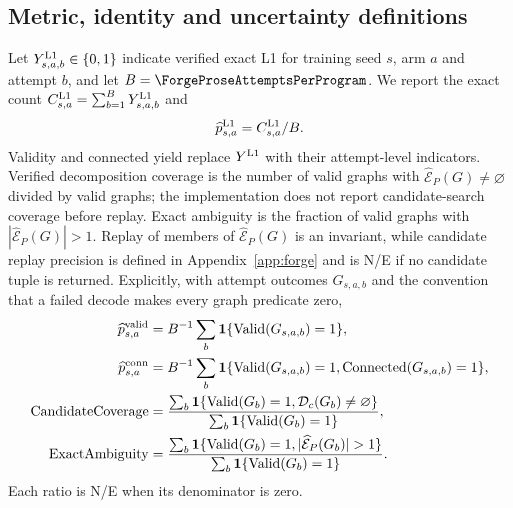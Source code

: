 \documentclass{article}
\begin{document}
\subsection{Metric, identity and uncertainty definitions}

Let $Y_{s,a,b}^{\rm L1}\in\{0,1\}$ indicate verified exact L1 for training seed $s$, arm $a$ and
attempt $b$, and let $B=\ForgeProseAttemptsPerProgram$. We report the exact count
$C_{s,a}^{\rm L1}=\sum_{b=1}^B Y_{s,a,b}^{\rm L1}$ and
\begin{equation}
 \widehat p_{s,a}^{\rm L1}=C_{s,a}^{\rm L1}/B.
\end{equation}
Validity and connected yield replace $Y^{\rm L1}$ with their attempt-level indicators. Verified
decomposition coverage is the number of valid graphs with
$\widehat{\mathcal E}_P(G)\neq\varnothing$ divided by valid graphs; the implementation does not
report candidate-search coverage before replay. Exact ambiguity is the fraction of valid graphs with
$|\widehat{\mathcal E}_P(G)|>1$. Replay of members of $\widehat{\mathcal E}_P(G)$ is an invariant,
while candidate replay precision is defined in Appendix~\ref{app:forge} and is N/E if no candidate
tuple is returned.
Explicitly, with attempt outcomes $G_{s,a,b}$ and the convention that a failed decode makes every
graph predicate zero,
\begin{align}
 \widehat p^{\rm valid}_{s,a}
 &=B^{-1}\sum_b\mathbf 1\{\mathrm{Valid}(G_{s,a,b})=1\},\\
 \widehat p^{\rm conn}_{s,a}
 &=B^{-1}\sum_b\mathbf 1\{\mathrm{Valid}(G_{s,a,b})=1,
                              \mathrm{Connected}(G_{s,a,b})=1\},\\
 \mathrm{CandidateCoverage}
 &=\frac{\sum_b\mathbf 1\{\mathrm{Valid}(G_b)=1,
                              \mathcal D_c(G_b)\neq\varnothing\}}
         {\sum_b\mathbf 1\{\mathrm{Valid}(G_b)=1\}},\\
 \mathrm{ExactAmbiguity}
 &=\frac{\sum_b\mathbf 1\{\mathrm{Valid}(G_b)=1,
                              |\widehat{\mathcal E}_P(G_b)|>1\}}
         {\sum_b\mathbf 1\{\mathrm{Valid}(G_b)=1\}}.
\end{align}
Each ratio is N/E when its denominator is zero.
\end{document}
